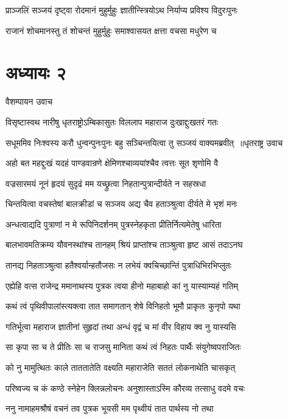 \twolineshloka
{प्राञ्जलिं सञ्जयं दृष्ट्वा रोदमानं मुहुर्मुहुः}
{ज्ञातीन्स्त्रियोऽथ निर्याप्य प्रविश्य विदुरःपुनः}


\twolineshloka
{राजानं शोचमानस्तु तं शोचन्तं मुहुर्मुहुः}
{समाश्वासयत क्षत्ता वचसा मधुरेण च}


\chapter{अध्यायः २}
\twolineshloka
{वैशम्पायन उवाच}
{}


\twolineshloka
{विसृष्टास्वथ नारीषु धृतराष्ट्रोऽम्बिकासुतः}
{विललाप महाराज दुःखाद्दुःखतरं गतः}


\threelineshloka
{सधूममिव निःश्वस्य करौ धुन्वन्पुनःपुनः}
{बहु सञ्चिन्तयित्वा तु सञ्जयं वाक्यमब्रवीत् ॥धृतराष्ट्र उवाच}
{}


\twolineshloka
{अहो बत महद्दुःखं यदहं पाण्डवान्रणे}
{क्षेमिणश्चाव्ययांश्चैव त्वत्तः सूत शृणोमि वै}


\twolineshloka
{वज्रसारमयं नूनं हृदयं सुदृढं मम}
{यच्छ्रुत्वा निहतान्पुत्रान्दीर्यते न सहस्रधा}


\twolineshloka
{चिन्तयित्वा वचस्तेषां बालक्रीडां च सञ्जय}
{अद्य चैव हताञ्श्रुत्वा दीर्यते मे भृशं मनः}


\twolineshloka
{अन्धत्वाद्यदि पुत्राणां न मे रूपिनिदर्शनम्}
{पुत्रस्नेहकृता प्रीतिर्नित्यमेतेषु धारिता}


\twolineshloka
{बालभावमतिक्रम्य यौवनस्थांश्च तानहम्}
{श्रियं प्राप्तांश्च ताञ्श्रुत्वा हृष्ट आसं तदाऽनघ}


\twolineshloka
{तानद्य निहताञ्श्रुत्वा हतैश्वर्यान्हतौजसः}
{न लभेयं क्वचिच्छान्तिं पुत्राधिभिरभिप्लुतः}


\twolineshloka
{एह्येहि वत्स राजेन्द्र ममानाथस्य पुत्रक}
{त्वया हीनो महाबाहो कां नु यास्याम्यहं गतिम्}


\twolineshloka
{कथं त्वं पृथिवीपालांस्त्यक्त्वा तात समागतान्}
{शेषे विनिहतो भूमौ प्राकृतः कुनृपो यथा}


\twolineshloka
{गतिर्भूत्वा महाराज ज्ञातीनां सुहृदां तथा}
{अन्धं वृद्वं च मां वीर विहाय क्व नु यास्यसि}


\twolineshloka
{सा कृपा सा च ते प्रीतिः सा च राजसु मानिता}
{कथं त्वं निहतः पार्थैः संयुगेष्वपराजितः}


\twolineshloka
{को नु मामुत्थितः काले ताततातेति वक्ष्यति}
{महाराजेति सततं लोकनाथेति चासकृत्}


\twolineshloka
{परिष्वज्य च कं कण्ठे स्नेहेन क्लिन्नलोचनः}
{अनुशास्ताऽस्मि कौरव्य तत्साधु वदमे वचः}


\twolineshloka
{ननु नामाहमश्रौषं वचनं तव पुत्रक}
{भूयसी मम पृथ्वीयं तात पार्थस्य नो तथा}


